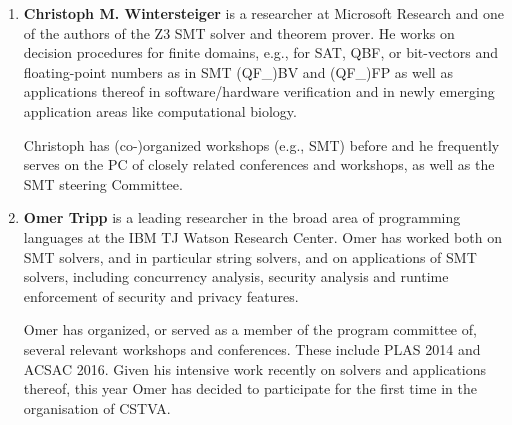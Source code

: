 \documentclass{sig-alternate}
\begin{document}
\begin{enumerate}
\item {\bf Christoph M. Wintersteiger} is a researcher at Microsoft Research and
  one of the authors of the Z3 SMT solver and theorem prover. He works on
  decision procedures for finite domains, e.g., for SAT, QBF, or bit-vectors
  and floating-point numbers as in SMT (QF\_)BV and (QF\_)FP as well as
  applications thereof in software/hardware verification and in newly emerging
  application areas like computational biology.  

  Christoph has (co-)organized workshops (e.g., SMT) before and he frequently
  serves on the PC of closely related conferences and workshops, as well as the
  SMT steering Committee. 

\item {\bf Omer Tripp} is a leading researcher in the broad area of programming
  languages at the IBM TJ Watson Research Center. Omer has worked both on SMT
  solvers, and in particular string solvers, and on applications of SMT
  solvers, including concurrency analysis, security analysis and runtime
  enforcement of security and privacy features. 
  
  Omer has organized, or served as a member of the program committee of,
  several relevant workshops and conferences. These include PLAS 2014 and ACSAC
  2016. Given his intensive work recently on solvers and applications thereof,
  this year Omer has decided to participate for the first time in the
  organisation of CSTVA. 
\end{enumerate}
\end{document}

